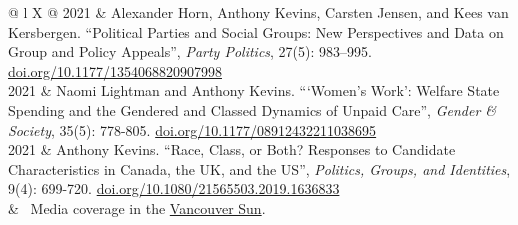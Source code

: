 \documentclass[letterpaper,fontsize=10.5pt]{scrartcl}
\begin{document}
\begin{longtblr}[entry=none,label=none]{@{} l X @{} }
	2021 & Alexander Horn, Anthony Kevins, Carsten Jensen, and Kees van Kersbergen. ``Political Parties and Social Groups: New Perspectives and Data on Group and Policy Appeals'', \textit{Party Politics}, 27(5): 983–995. \href{https://doi.org/10.1177/1354068820907998}{doi.org/10.1177/1354068820907998}                                             \\

	2021          & Naomi Lightman and  Anthony Kevins. ```Women's Work': Welfare State Spending and the Gendered and Classed Dynamics of Unpaid Care'', \textit{Gender \& Society}, 35(5): 778-805. \href{https://doi.org/10.1177/08912432211038695}{doi.org/10.1177/08912432211038695}                                                                          \\
	2021          & Anthony Kevins. ``Race, Class, or Both? Responses to Candidate Characteristics in Canada, the UK, and the US'', \textit{Politics, Groups, and Identities}, 9(4): 699-720. \href{https://doi.org/10.1080/21565503.2019.1636833}{doi.org/10.1080/21565503.2019.1636833}                                                                         \\
	& \textbullet\ Media coverage in the \href{https://vancouversun.com/opinion/columnists/women-people-colour-get-fewer-votes-canada-studies}{Vancouver Sun}.                                                                                                    \\



\end{longtblr}
\end{document}
